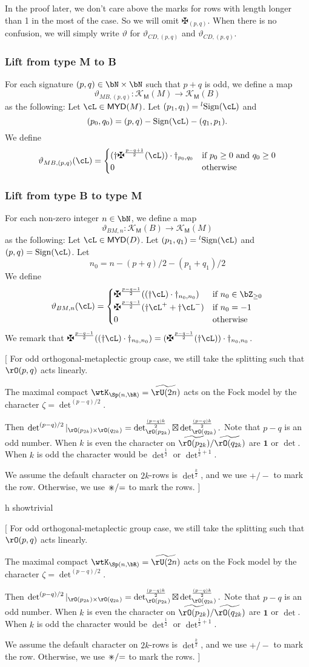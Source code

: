 \documentclass[12pt,a4paper]{amsart}
\newcommand{\trivial}[2][]{\if\relax\detokenize{#1}\relax
  {%
      \color{orange} \vspace{0em} $[$  #2 $]$
      \color{black}
  }
  \else
\ifx#1h
\ifcsname showtrivial\endcsname
{%
    \color{orange} \vspace{0em}  $[$ #2 $]$
    \color{black}
}
\fi
\else {\red Wrong argument!} \fi
\fi
}
\def\MYD{{\mathsf{MYD}}}
\def\KM{{\mathcal{K_{\mathsf{M}}}}}
\newcommand{\bfone}{\mathbf{1}}
\numberwithin{equation}{section}
\theoremstyle{remark}
\def\half{{\tfrac{1}{2}}}
\def\lsign{{}^l\mathrm{Sign}}
\def\ssign{\mathrm{Sign}}
\def\umm{{=}}
\def\upp{{\ast}}
\def\upp{
  {{\setbox0\hbox{$\times$}
      \rlap{\hbox to \wd0{\hss$+$\hss}}\box0
    }}
}
\begin{document}
{
  \color{red}
  In the proof later, we don't care above the marks for rows with length longer
  than 1 in the most of the case. So we will omit $\maltese_{(p,q)}$.
  When there is no confusion, we will simply write $\vartheta$ for
  $\vartheta_{CD,(p,q)}$ and $\vartheta_{CD,(p,q)}$.
}


\subsubsection{Lift from type M to B}

For each signature $(p,q)\in \bN\times \bN$ such that $p+q$ is odd, we define a map
\[
  \vartheta_{MB,(p,q)} \colon \KM(M)\rightarrow \KM(B)
\]
as the following:
Let $\cL\in \MYD(M)$. Let $(p_{1},q_{1})=\lsign(\cL)$ and
\[
(p_{0}, q_{0})  = (p,q) -\ssign(\cL)-(q_{1},p_{1}).
\]
We define
\[
  \vartheta_{MB,(p,q)}(\cL) =
  \begin{cases}
    (\dagger \maltese^{\frac{p-q+1}{2}}(\cL))\cdot \dagger_{p_{0}, q_{0}} &
    \text{if } p_{0}\geq 0 \text{ and } q_{0} \geq 0\\
    0 & \text{otherwise}
  \end{cases}
\]


\subsubsection{Lift from type B to type M}

For each non-zero integer $n\in \bN$, we define a map
\[
  \vartheta_{BM,n} \colon \KM(B)\rightarrow \KM(M)
\]
as the following:
Let $\cL\in \MYD(D)$. Let $(p_{1},q_{1})=\lsign(\cL)$ and
$(p,q) = \ssign(\cL)$.
Let
\[
  n_{0} = n - (p+q)/2 - (p_{1}+q_{1})/2
\]
We define
\[
  \vartheta_{BM,n}(\cL) =
  \begin{cases}
    \maltese^{\frac{p-q-1}{2}}((\dagger \cL)\cdot \dagger_{n_{0}, n_{0}}) &
    \text{if } n_{0}\in \bZ_{\geq 0}\\
    \maltese^{\frac{p-q-1}{2}}(\dagger \cL^{+}  + \dagger \cL^{-})& \text{if } n_{0}=-1\\
    0&\text{otherwise}
  \end{cases}
\]
We remark that
$\maltese^{\frac{p-q-1}{2}}((\dagger \cL)\cdot \dagger_{n_{0}, n_{0}})= (\maltese^{\frac{p-q-1}{2}}(\dagger\cL))\cdot \dagger_{n_{0},n_{0}}$.

\trivial{
  For odd orthogonal-metaplectic group case, we still take the splitting such
  that $\rO(p,q)$ acts linearly.

  The maximal compact $\wtK_{\Sp(n,\bR)}= \widetilde{\rU(2n)}$ acts on the Fock model by the
  character $\zeta=\det^{(p-q)/2}$.

  Then
  $\det^{(p-q)/2}|_{\rO(p_{2k})\times \rO(q_{2k})}=\det^{\frac{(p-q)k}{2}}_{\rO(p_{2k})}\boxtimes
  \det^{\frac{(p-q)k}{2}}_{\rO(q_{2k})}. $
  Note that $p-q$ is an odd number.
  When $k$ is even the character on $\widetilde{\rO(p_{2k})}/\widetilde{\rO(q_{2k})}$ are
  $\bfone$ or $\det$. When $k$ is odd the character would be $\det^{\half}$ or
  $\det^{\half+1}$.

  We assume the default character on $2k$-rows is $\det^{\frac{k}{2}}$, and
  we use $+/-$ to mark the row. Otherwise, we use $\upp/\umm$ to mark the rows.
}
\end{document}
